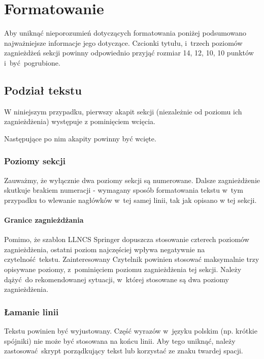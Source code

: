 \section{Formatowanie}
\label{sec:formatting}

Aby uniknąć nieporozumień dotyczących formatowania poniżej podsumowano najważniejsze informacje jego dotyczące. Czcionki tytułu, i~trzech poziomów zagnieżdżeń sekcji powinny odpowiednio przyjąć rozmiar 14, 12, 10, 10 punktów i~być pogrubione.

\subsection{Podział tekstu}
\label{subsec:textDivision}

W niniejszym przypadku, pierwszy akapit sekcji (niezależnie od poziomu ich zagnieżdżenia) występuje z pominięciem wcięcia.

Następujące po nim akapity powinny być wcięte.

\subsubsection{Poziomy sekcji}
\label{subsubsec:levels}

Zauważmy, że wyłącznie dwa poziomy sekcji są numerowane. Dalsze zagnieżdżenie skutkuje brakiem numeracji - wymagany sposób formatowania tekstu w~tym przypadku to wlewanie nagłówków w~tej samej linii, tak jak opisano w tej sekcji.

\paragraph{Granice zagnieżdżania}
\label{par:nestingLimits}

Pomimo, że szablon LLNCS Springer dopuszcza stosowanie czterech poziomów zagnieżdżenia, ostatni poziom najczęściej wpływa negatywnie na czytelność tekstu. Zainteresowany Czytelnik powinien stosować maksymalnie trzy opisywane poziomy, z~pominięciem poziomu zagnieżdżenia tej sekcji. Należy dążyć do rekomendowanej sytuacji, w~której stosowane są dwa poziomy zagnieżdżenia.

\subsubsection{Łamanie linii}
\label{subsubsec:linebreak}

Tekstu powinien być wyjustowany. Część wyrazów w~języku polskim (np. krótkie spójniki) nie może być stosowana na końcu linii. Aby tego uniknąć, należy zastosować skrypt porządkujący tekst lub korzystać ze znaku twardej spacji.

